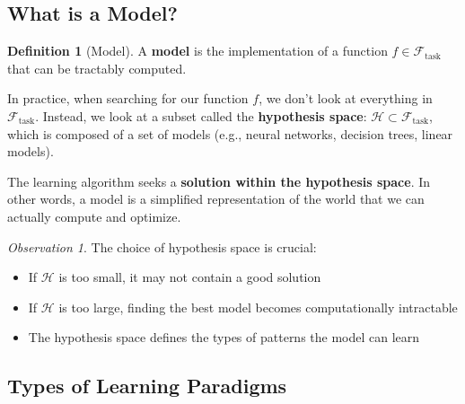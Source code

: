 \documentclass[11pt,a4paper]{article}
\theoremstyle{definition}
\newtheorem{definition}{Definition}[section]
\theoremstyle{plain}
\theoremstyle{remark}
\newtheorem*{observation}{Observation}
\begin{document}
\subsection{What is a Model?}

\begin{definition}[Model]
A \textbf{model} is the implementation of a function $f \in \mathcal{F}_{\text{task}}$ that can be tractably computed.
\end{definition}

In practice, when searching for our function $f$, we don't look at everything in $\mathcal{F}_{\text{task}}$. Instead, we look at a subset called the \textbf{hypothesis space}: $\mathcal{H} \subset \mathcal{F}_{\text{task}}$, which is composed of a set of models (e.g., neural networks, decision trees, linear models).

The learning algorithm seeks a \textbf{solution within the hypothesis space}. In other words, a model is a simplified representation of the world that we can actually compute and optimize.

\begin{observation}
The choice of hypothesis space is crucial:
\begin{itemize}
    \item If $\mathcal{H}$ is too small, it may not contain a good solution
    \item If $\mathcal{H}$ is too large, finding the best model becomes computationally intractable
    \item The hypothesis space defines the types of patterns the model can learn
\end{itemize}
\end{observation}

\subsection{Types of Learning Paradigms}
\end{document}
